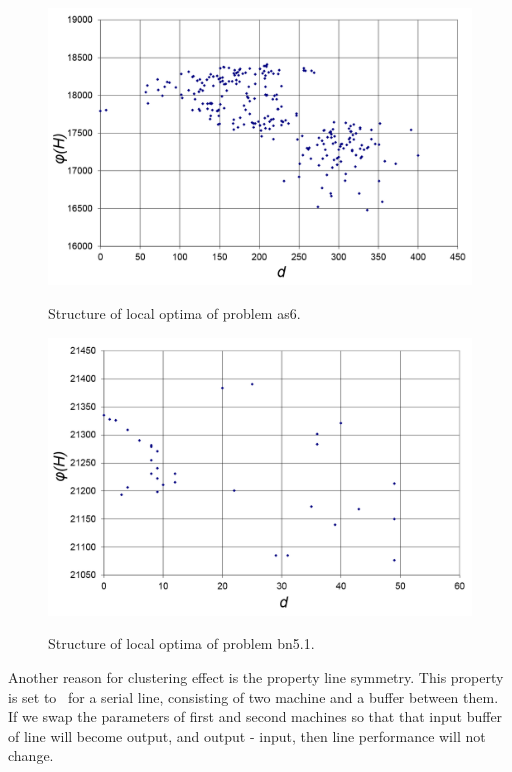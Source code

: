 \documentclass{ifacconf}
\begin{document}
\begin{figure}[h!]
	\begin{center}
		\includegraphics[scale=0.2]{klaster_as4.png}\\
		\caption{Structure of local optima of problem as6.} \label{klaster_as4}
	\end{center}
\end{figure} 
\begin{figure}[h!]
	\begin{center}
		\includegraphics[scale=0.2]{klaster_bn5_1.png}\\
		\caption{Structure of local optima of problem bn5.1.} \label{klaster_bn5_1}
	\end{center}
\end{figure} 

Another reason for clustering effect is the property
line symmetry. This property is set to~\cite{LP} for a serial line,
consisting of two machine and a buffer
between them. If we swap the parameters of first and second machines so that
that input buffer of line will become output, and output - input, then
line performance will not change.
\end{document}
